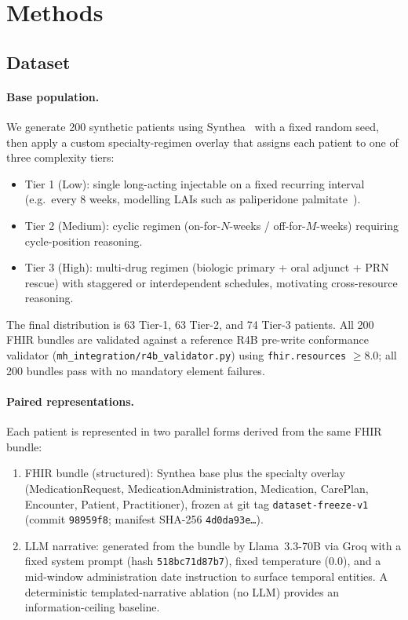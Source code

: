 \section{Methods}
\label{sec:methods}

\subsection{Dataset}
\label{sec:methods:dataset}

\paragraph{Base population.}
We generate 200 synthetic patients using Synthea~\citep{walonoski2018synthea}
with a fixed random seed, then apply a custom specialty-regimen overlay that assigns each
patient to one of three complexity tiers:
\begin{itemize}
  \item Tier 1 (Low): single long-acting injectable on a fixed recurring interval
    (e.g.\ every 8 weeks, modelling LAIs such as paliperidone palmitate~\citep{correll2024pp6m}).
  \item Tier 2 (Medium): cyclic regimen (on-for-$N$-weeks / off-for-$M$-weeks)
    requiring cycle-position reasoning.
  \item Tier 3 (High): multi-drug regimen (biologic primary + oral adjunct + PRN
    rescue) with staggered or interdependent schedules, motivating cross-resource reasoning.
\end{itemize}
The final distribution is 63 Tier-1, 63 Tier-2, and 74 Tier-3 patients.  All 200 FHIR bundles
are validated against a reference R4B pre-write conformance validator
(\texttt{mh\_integration/r4b\_validator.py}) using \texttt{fhir.resources} $\geq$8.0; all
200 bundles pass with no mandatory element failures.

\paragraph{Paired representations.}
Each patient is represented in two parallel forms derived from the same FHIR bundle:
\begin{enumerate}
  \item FHIR bundle (structured): Synthea base plus the specialty overlay
    (MedicationRequest, MedicationAdministration, Medication, CarePlan, Encounter, Patient,
    Practitioner), frozen at git tag \texttt{dataset-freeze-v1} (commit \texttt{98959f8};
    manifest SHA-256 \texttt{4d0da93e\ldots}).
  \item LLM narrative: generated from the bundle by Llama~3.3-70B via Groq with
    a fixed system prompt (hash \texttt{518bc71d87b7}), fixed temperature (0.0), and a
    mid-window administration date instruction to surface temporal entities.  A deterministic
    templated-narrative ablation (no LLM) provides an information-ceiling baseline.
\end{enumerate}

